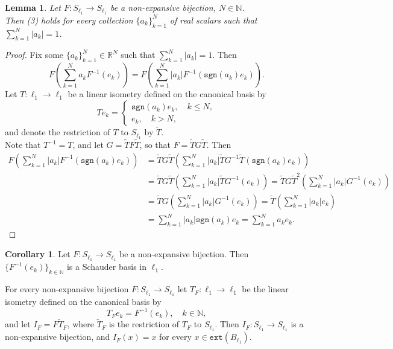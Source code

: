 \documentclass[reqno]{amsart}
\theoremstyle{plain}
\newtheorem{lemma}{Lemma}[section]
\theoremstyle{remark}
\theoremstyle{definition}
\newtheorem{corollary}{Corollary}[section]
\newcommand{\R}{\mathbb R}
\newcommand{\N}{\mathbb N}
\begin{document}
\begin{lemma}\label{l1lem4}
    Let $F:S_{\ell_1} \rightarrow S_{\ell_1}$ be a non-expansive bijection, $N \in \N$.\\ Then (3) holds for every collection $\{a_k\}_{k=1}^N$ of real scalars such that $\sum_{k=1}^N|a_k|=1$.
\end{lemma}

\begin{proof}
    Fix some $\{a_k\}_{k=1}^N \in \R^N$ such that $\sum_{k=1}^N|a_k|=1$. Then 
    \[F\left(\sum_{k=1}^Na_kF^{-1}(e_k)\right)=F\left(\sum_{k=1}^N|a_k|F^{-1}(\mathtt{sgn}(a_k)e_k)\right).\]
    Let $T:\ell_1\rightarrow \ell_1$ be a linear isometry defined on the canonical basis by \[Te_k=\begin{cases}\mathtt{sgn}(a_k)e_k, \quad k\leq N,\\
    e_k, \quad k>N,    
    \end{cases}\]
    and denote the restriction of $T$ to $S_{\ell_1}$ by $\tilde T$.\\
    Note that $T^{-1}=T$, and let $G=\tilde T F \tilde T$, so that $F=\tilde T G \tilde T$. Then 
    \begin{equation*}
        \begin{split}
            F\left(\sum_{k=1}^N|a_k|F^{-1}(\mathtt{sgn}(a_k)e_k)\right)  & =\tilde T G \tilde T\left( \sum_{k=1}^N|a_k|\tilde T G^{-1} \tilde T(\mathtt{sgn}(a_k)e_k)\right) \\
            & = \tilde T G \tilde T\left( \sum_{k=1}^N|a_k|\tilde T G^{-1} (e_k)\right) 
            = \tilde T G \tilde T^2\left( \sum_{k=1}^N|a_k| G^{-1} (e_k)\right) \\
            & = \tilde T G \left( \sum_{k=1}^N|a_k| G^{-1} (e_k)\right)=\tilde T \left( \sum_{k=1}^N|a_k|e_k \right) \\
            & = \sum_{k=1}^N|a_k|\mathtt{sgn}(a_k)e_k=\sum_{k=1}^Na_ke_k.
        \end{split}
    \end{equation*}
\end{proof}

\begin{corollary}
    Let $F:S_{\ell_1}\rightarrow S_{\ell_1}$ be a non-expansive bijection. Then $\{F^{-1}(e_k)\}_{k\in \N}$ is a Schauder basis in $\ell_1$.
\end{corollary}

For every non-expansive bijection $F:S_{\ell_1}\rightarrow S_{\ell_1}$ 
let $T_F:\ell_1\rightarrow \ell_1$ be the linear isometry defined on the canonical basis by \[T_Fe_k=F^{-1}(e_k), \quad k\in \N,\]
and let $I_F=F \tilde{T}_F$, where $\tilde{T}_F$ is the restriction of $T_F$ to $S_{\ell_1}$. Then $I_F:S_{\ell_1}\rightarrow S_{\ell_1}$ is a\\ non-expansive bijection, and $I_F(x)=x$ for every $x \in \mathtt{ext}(B_{\ell_1})$.
\end{document}
